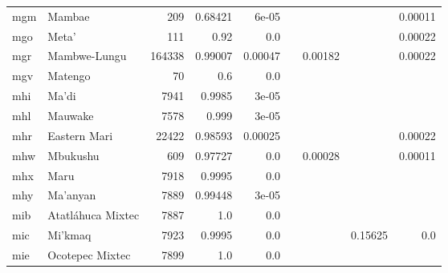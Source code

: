 \documentclass[11pt]{article}
\begin{document}
\begin{table*}[h]
{\begin{tabular}{llrrrrrrr}
mgm         & Mambae         & 209         & 0.68421         & 6e-05         &          &          &          & 0.00011         \\

mgo         & Meta'         & 111         & 0.92         & 0.0         &          &          &          & 0.00022         \\

mgr         & Mambwe-Lungu         & 164338         & 0.99007         & 0.00047         &          & 0.00182         &          & 0.00022         \\

mgv         & Matengo         & 70         & 0.6         & 0.0         &          &          &          &          \\

mhi         & Ma'di         & 7941         & 0.9985         & 3e-05         &          &          &          &          \\

mhl         & Mauwake         & 7578         & 0.999         & 3e-05         &          &          &          &          \\

mhr         & Eastern Mari         & 22422         & 0.98593         & 0.00025         &          &          &          & 0.00022         \\

mhw         & Mbukushu         & 609         & 0.97727         & 0.0         &          & 0.00028         &          & 0.00011         \\

mhx         & Maru         & 7918         & 0.9995         & 0.0         &          &          &          &          \\

mhy         & Ma'anyan         & 7889         & 0.99448         & 3e-05         &          &          &          &          \\

mib         & Atatláhuca Mixtec         & 7887         & 1.0         & 0.0         &          &          &          &          \\

mic         & Mi'kmaq         & 7923         & 0.9995         & 0.0         &          &          & 0.15625         & 0.0         \\

mie         & Ocotepec Mixtec         & 7899         & 1.0         & 0.0         &          &          &          &          \\


\end{tabular}}
\end{table*}
\end{document}
